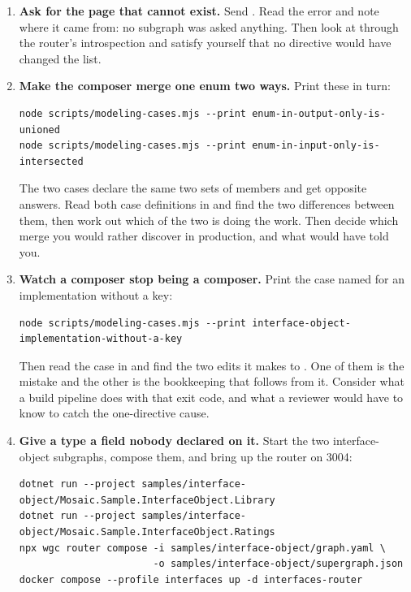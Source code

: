 \begin{enumerate}
  \item \textbf{Ask for the page that cannot exist.} Send
  .
  Read the error and note where it came from: no subgraph was asked anything.
  Then look at  through the router's introspection and
  satisfy yourself that no directive would have changed the list.

  \item \textbf{Make the composer merge one enum two ways.} Print these in turn:

  \begin{verbatim}
node scripts/modeling-cases.mjs --print enum-in-output-only-is-unioned
node scripts/modeling-cases.mjs --print enum-in-input-only-is-intersected
  \end{verbatim}

  The two cases declare the same two sets of members and get opposite answers.
  Read both case definitions in  and find the
  two differences between them, then work out which of the two is doing the
  work. Then decide which merge you would rather discover in production, and
  what would have told you.

  \item \textbf{Watch a composer stop being a composer.} Print the case named
  for an implementation without a key:

  \begin{verbatim}
node scripts/modeling-cases.mjs --print interface-object-implementation-without-a-key
  \end{verbatim}

  Then read the case in  and find the two edits
  it makes to . One of them
  is the mistake and the other is the bookkeeping that follows from it. Consider
  what a build pipeline does with that exit code, and what a reviewer would have
  to know to catch the one-directive cause.

  \item \textbf{Give a type a field nobody declared on it.} Start the two
  interface-object subgraphs, compose them, and bring up the router on 3004:

  \begin{verbatim}
dotnet run --project samples/interface-object/Mosaic.Sample.InterfaceObject.Library
dotnet run --project samples/interface-object/Mosaic.Sample.InterfaceObject.Ratings
npx wgc router compose -i samples/interface-object/graph.yaml \
                       -o samples/interface-object/supergraph.json
docker compose --profile interfaces up -d interfaces-router
  \end{verbatim}


\end{enumerate}
